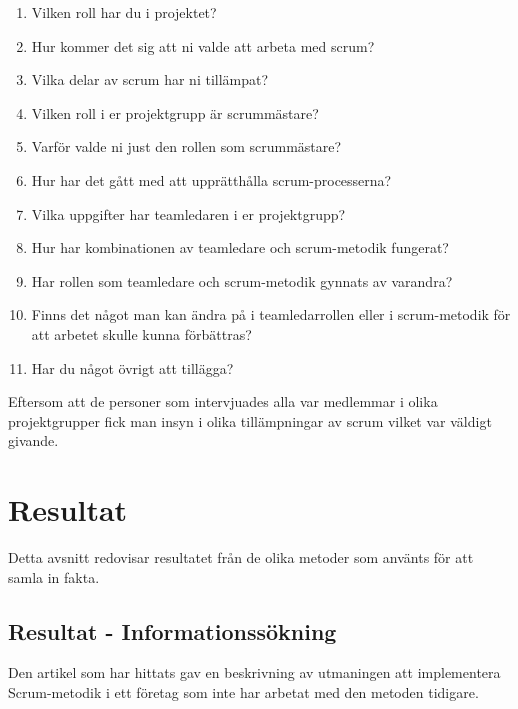 \begin{enumerate}

\item Vilken roll har du i projektet?

\item Hur kommer det sig att ni valde att arbeta med scrum?

\item Vilka delar av scrum har ni tillämpat?

\item Vilken roll i er projektgrupp är scrummästare?

\item Varför valde ni just den rollen som scrummästare?

\item Hur har det gått med att upprätthålla scrum-processerna?

\item Vilka uppgifter har teamledaren i er projektgrupp?

\item Hur har kombinationen av teamledare och scrum-metodik fungerat?

\item Har rollen som teamledare och scrum-metodik gynnats av varandra?

\item Finns det något man kan ändra på i teamledarrollen eller i scrum-metodik för att arbetet skulle kunna förbättras?

\item Har du något övrigt att tillägga?

\end{enumerate}

Eftersom att de personer som intervjuades alla var medlemmar i olika projektgrupper fick man insyn i olika tillämpningar av scrum vilket var väldigt givande.

\section{Resultat}
Detta avsnitt redovisar resultatet från de olika metoder som använts för att samla in fakta.

\subsection{Resultat - Informationssökning}
Den artikel som har hittats gav en beskrivning av utmaningen att implementera Scrum-metodik i ett företag som inte har arbetat med den metoden tidigare. 

